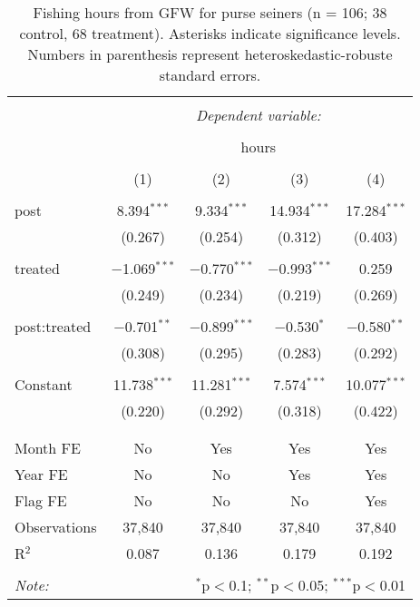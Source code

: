 \documentclass[11pt,]{article}
\begin{document}
\begin{table}[!htbp] \centering 
  \caption{\label{tab:purse_old}Fishing hours from GFW for purse seiners (n = 106; 38 control, 68 treatment). Asterisks indicate significance levels. Numbers in parenthesis represent heteroskedastic-robuste standard errors.} 
  \label{} 
\begin{tabular}{@{\extracolsep{5pt}}lcccc} 
\\[-1.8ex]\hline 
\hline \\[-1.8ex] 
 & \multicolumn{4}{c}{\textit{Dependent variable:}} \\ 
\cline{2-5} 
\\[-1.8ex] & \multicolumn{4}{c}{hours} \\ 
\\[-1.8ex] & (1) & (2) & (3) & (4)\\ 
\hline \\[-1.8ex] 
 post & 8.394$^{***}$ & 9.334$^{***}$ & 14.934$^{***}$ & 17.284$^{***}$ \\ 
  & (0.267) & (0.254) & (0.312) & (0.403) \\ 
  & & & & \\ 
 treated & $-$1.069$^{***}$ & $-$0.770$^{***}$ & $-$0.993$^{***}$ & 0.259 \\ 
  & (0.249) & (0.234) & (0.219) & (0.269) \\ 
  & & & & \\ 
 post:treated & $-$0.701$^{**}$ & $-$0.899$^{***}$ & $-$0.530$^{*}$ & $-$0.580$^{**}$ \\ 
  & (0.308) & (0.295) & (0.283) & (0.292) \\ 
  & & & & \\ 
 Constant & 11.738$^{***}$ & 11.281$^{***}$ & 7.574$^{***}$ & 10.077$^{***}$ \\ 
  & (0.220) & (0.292) & (0.318) & (0.422) \\ 
  & & & & \\ 
\hline \\[-1.8ex] 
Month FE & No & Yes & Yes & Yes \\ 
Year FE & No & No & Yes & Yes \\ 
Flag FE & No & No & No & Yes \\ 
Observations & 37,840 & 37,840 & 37,840 & 37,840 \\ 
R$^{2}$ & 0.087 & 0.136 & 0.179 & 0.192 \\ 
\hline 
\hline \\[-1.8ex] 
\textit{Note:}  & \multicolumn{4}{r}{$^{*}$p$<$0.1; $^{**}$p$<$0.05; $^{***}$p$<$0.01} \\ 
\end{tabular} 
\end{table}
\end{document}
